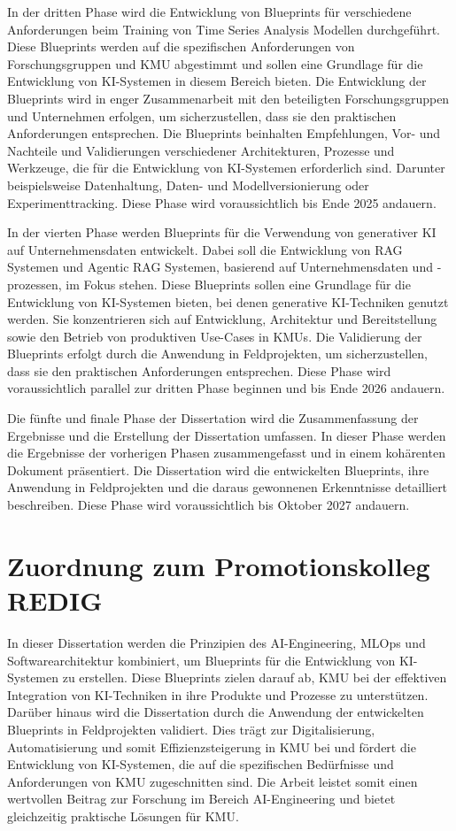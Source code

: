 \documentclass[11pt,a4paper,pointlessnumbers]{scrartcl}
\theoremstyle{break}
\numberwithin{equation}{section}
\begin{document}
In der dritten Phase wird die Entwicklung von Blueprints für verschiedene Anforderungen beim Training von Time Series Analysis Modellen durchgeführt. Diese Blueprints werden auf die spezifischen Anforderungen von Forschungsgruppen und KMU abgestimmt und sollen eine Grundlage für die Entwicklung von KI-Systemen in diesem Bereich bieten. Die Entwicklung der Blueprints wird in enger Zusammenarbeit mit den beteiligten Forschungsgruppen und Unternehmen erfolgen, um sicherzustellen, dass sie den praktischen Anforderungen entsprechen. Die Blueprints beinhalten Empfehlungen, Vor- und Nachteile und Validierungen verschiedener Architekturen, Prozesse und Werkzeuge, die für die Entwicklung von KI-Systemen erforderlich sind. Darunter beispielsweise Datenhaltung, Daten- und Modellversionierung oder Experimenttracking. Diese Phase wird voraussichtlich bis Ende 2025 andauern.

In der vierten Phase werden Blueprints für die Verwendung von generativer KI auf Unternehmensdaten entwickelt. Dabei soll die Entwicklung von RAG Systemen und Agentic RAG Systemen, basierend auf Unternehmensdaten und -prozessen, im Fokus stehen. Diese Blueprints sollen eine Grundlage für die Entwicklung von KI-Systemen bieten, bei denen generative KI-Techniken genutzt werden. Sie konzentrieren sich auf Entwicklung, Architektur und Bereitstellung sowie den Betrieb von produktiven Use-Cases in KMUs. Die Validierung der Blueprints erfolgt durch die Anwendung in Feldprojekten, um sicherzustellen, dass sie den praktischen Anforderungen entsprechen. Diese Phase wird voraussichtlich parallel zur dritten Phase beginnen und bis Ende 2026 andauern.

Die fünfte und finale Phase der Dissertation wird die Zusammenfassung der Ergebnisse und die Erstellung der Dissertation umfassen. In dieser Phase werden die Ergebnisse der vorherigen Phasen zusammengefasst und in einem kohärenten Dokument präsentiert. Die Dissertation wird die entwickelten Blueprints, ihre Anwendung in Feldprojekten und die daraus gewonnenen Erkenntnisse detailliert beschreiben. Diese Phase wird voraussichtlich bis Oktober 2027 andauern.

\section{Zuordnung zum Promotionskolleg REDIG}
In dieser Dissertation werden die Prinzipien des AI-Engineering, MLOps und Softwarearchitektur kombiniert, um Blueprints für die Entwicklung von KI-Systemen zu erstellen. Diese Blueprints zielen darauf ab, KMU bei der effektiven Integration von KI-Techniken in ihre Produkte und Prozesse zu unterstützen. Darüber hinaus wird die Dissertation durch die Anwendung der entwickelten Blueprints in Feldprojekten validiert. Dies trägt zur Digitalisierung, Automatisierung und somit Effizienzsteigerung in KMU bei und fördert die Entwicklung von KI-Systemen, die auf die spezifischen Bedürfnisse und Anforderungen von KMU zugeschnitten sind. Die Arbeit leistet somit einen wertvollen Beitrag zur Forschung im Bereich AI-Engineering und bietet gleichzeitig praktische Lösungen für KMU.

\newpage

\end{document}
